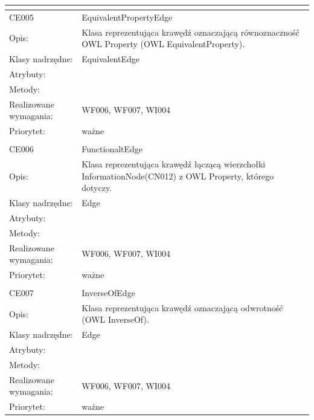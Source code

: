 \documentclass[a4paper,10pt]{article}
\begin{document}
\begin{center}
\begin{longtable}{|m{3cm}|m{9cm}|}
\multicolumn{2}{c}{} \\
 \hline

CE005 & EquivalentPropertyEdge \\ \hline
Opis: & Klasa reprezentująca krawędź oznaczającą równoznaczność OWL Property (OWL EquivalentProperty).    \\ \hline
Klasy nadrzędne: & EquivalentEdge    \\ \hline
Atrybuty: & %
 \\ \hline
Metody: & %
  \\ \hline
Realizowane wymagania: & WF006, WF007, WI004 \\ \hline
Priorytet: & ważne  \\ \hline

\multicolumn{2}{c}{} \\
 \hline

CE006 & FunctionaltEdge \\ \hline
Opis: & Klasa reprezentująca krawędź łączącą wierzchołki InformationNode(CN012) z OWL Property, którego dotyczy.   \\ \hline
Klasy nadrzędne: & Edge    \\ \hline
Atrybuty: & %
 \\ \hline
Metody: & %
  \\ \hline
Realizowane wymagania: & WF006, WF007, WI004 \\ \hline
Priorytet: & ważne  \\ \hline

\multicolumn{2}{c}{} \\
 \hline

CE007 & InverseOfEdge \\ \hline
Opis: & Klasa reprezentująca krawędź oznaczającą odwrotność (OWL InverseOf).    \\ \hline
Klasy nadrzędne: & Edge    \\ \hline
Atrybuty: & %
 \\ \hline
Metody: & %
  \\ \hline
Realizowane wymagania: & WF006, WF007, WI004 \\ \hline
Priorytet: & ważne  \\ \hline


\end{longtable}
\end{center}
\end{document}

